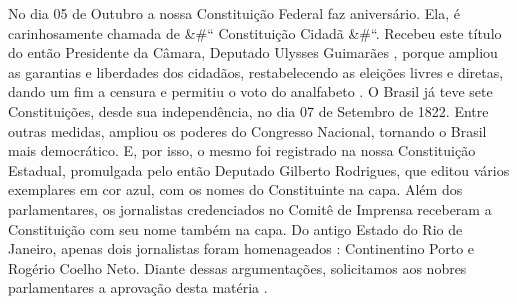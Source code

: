 \documentclass[10pt]{article}
\begin{document}
  No dia  05 de Outubro a  nossa Constituição Federal faz aniversário. Ela, é carinhosamente chamada de &#`` Constituição Cidadã &#``. 
Recebeu este título do então Presidente da Câmara, Deputado Ulysses Guimarães , porque ampliou as garantias e liberdades dos cidadãos, restabelecendo as eleições livres e diretas, dando um fim a censura e permitiu o voto do analfabeto .
O Brasil já teve sete Constituições, desde sua independência,   no dia 07 de Setembro de 1822.
 Entre outras medidas, ampliou  os  poderes do Congresso Nacional, tornando o Brasil mais democrático. E, por isso, o mesmo foi registrado na nossa Constituição Estadual, promulgada pelo então Deputado Gilberto Rodrigues, que editou vários exemplares em cor azul, com os nomes do  Constituinte na capa.
 Além dos parlamentares, os jornalistas credenciados no Comitê de Imprensa receberam a Constituição com seu nome   também na capa. Do antigo Estado do Rio de Janeiro, apenas dois jornalistas foram homenageados : Continentino Porto e Rogério Coelho Neto.
Diante dessas argumentações, solicitamos aos nobres parlamentares a aprovação desta matéria .



\iffalse
\begin{center}
  \textbf{REFERÊNCIAS}
\end{center}


\fi
\end{document}
